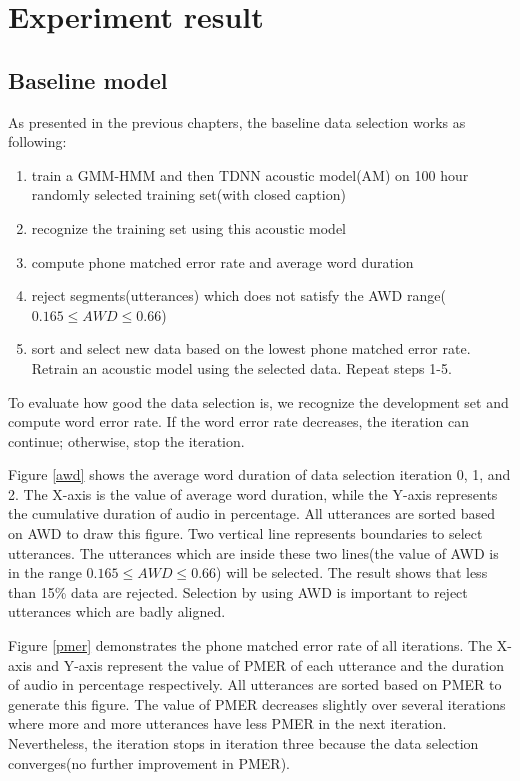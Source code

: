 \chapter{Experiment result}

\section{Baseline model}
As presented in the previous chapters, the baseline data selection works as following:
\begin{enumerate}
\item train a GMM-HMM and then TDNN acoustic model(AM) on 100 hour randomly selected training set(with closed caption)
\item recognize the training set using this acoustic model 
\item compute  phone matched error rate and average word duration
\item reject segments(utterances) which does not satisfy the AWD range($0.165 \leq AWD \leq 0.66$)
\item sort and select new data based on the lowest phone matched error rate. Retrain an acoustic model using the selected data. Repeat steps 1-5.
\end{enumerate}
To evaluate how good the data selection is, we recognize the development set and compute word error rate. If the word error rate decreases, the iteration can continue; otherwise, stop the iteration.

Figure \ref{awd} shows the average word duration of data selection iteration 0, 1, and 2. The X-axis is the value of average word duration, while the Y-axis represents the cumulative duration of audio in percentage. All utterances are sorted based on AWD to draw this figure. Two vertical line represents boundaries to select utterances. The utterances which are inside these two lines(the value of AWD is in the range $0.165 \leq AWD \leq 0.66$) will be selected. The result shows that less than 15\% data are rejected. Selection by using AWD is important to reject utterances which are badly aligned.

Figure  \ref{pmer} demonstrates the phone matched error rate of all iterations. The X-axis and Y-axis represent the value of PMER of each utterance and the duration of audio in percentage respectively. All utterances are sorted based on PMER to generate this figure. The value of PMER decreases slightly over several iterations where more and more utterances have less PMER in the next iteration. Nevertheless, the iteration stops in iteration three because the data selection converges(no further improvement in PMER).

